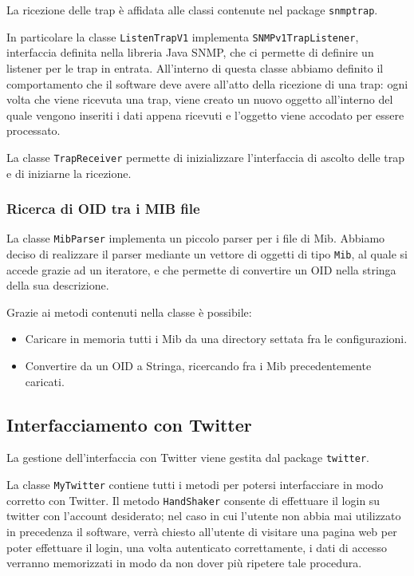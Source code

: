 \documentclass[a4paper, 10pt]{article}
\begin{document}
La ricezione delle trap \`e affidata alle classi contenute nel package \texttt{snmptrap}.

In particolare la classe \texttt{ListenTrapV1} implementa \texttt{SNMPv1TrapListener}, interfaccia definita nella libreria Java SNMP, che ci permette di definire un listener per le trap in entrata. All'interno di questa classe abbiamo definito il comportamento che il software deve avere all'atto della ricezione di una trap: ogni volta che viene ricevuta una trap, viene creato un nuovo oggetto all'interno del quale vengono inseriti i dati appena ricevuti e l'oggetto viene accodato per essere processato.

La classe \texttt{TrapReceiver} permette di inizializzare l'interfaccia di ascolto delle trap e di iniziarne la ricezione.

\subsubsection{Ricerca di OID tra i MIB file}

La classe \texttt{MibParser} implementa un piccolo parser per i file di Mib.
Abbiamo deciso di realizzare il parser mediante un vettore di oggetti di tipo \texttt{Mib}, al quale si accede grazie ad un iteratore, e che permette di convertire un OID nella stringa della sua descrizione.

Grazie ai metodi contenuti nella classe \`e possibile:
\begin{itemize}
	\item Caricare in memoria tutti i Mib da una directory settata fra le configurazioni.
	\item Convertire da un OID a Stringa, ricercando fra i Mib precedentemente caricati.
\end{itemize} 

\subsection{Interfacciamento con Twitter}

La gestione dell'interfaccia con Twitter viene gestita dal package \texttt{twitter}.

La classe \texttt{MyTwitter} contiene tutti i metodi per potersi interfacciare in modo corretto con Twitter. Il metodo \texttt{HandShaker} consente di effettuare il login su twitter con l'account desiderato; nel caso in cui l'utente non abbia mai utilizzato in precedenza il software, verr\`a chiesto all'utente di visitare una pagina web per poter effettuare il login, una volta autenticato correttamente, i dati di accesso verranno memorizzati in modo da non dover pi\`u ripetere tale procedura.
\end{document}
